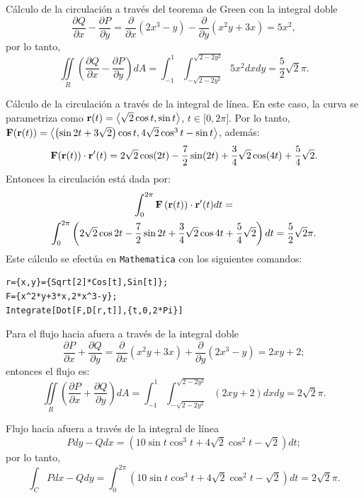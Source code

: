 \begin{parrafoitemize}
\item Cálculo de la circulación a través del teorema de Green con la integral doble
\[\frac{\partial Q}{\partial x}-\frac{\partial P}{\partial y}=\frac{\partial }{\partial x}\left( 2x^{3}-y\right)-
\frac{\partial }{\partial y}\left( x^{2}y+3x\right) = 5x^{2},\]
por lo tanto,
\[\iint\limits_{R}\left( \frac{\partial Q}{\partial x}-\frac{\partial P}{\partial y}\right) dA=\int_{-1}^{1}\int_{-\sqrt{2-2y^{2}} }^{\sqrt{2-2y^{2}} }5x^{2}dxdy= \frac{5}{2}\sqrt{2}\pi.\]
\item Cálculo de la circulación a través de la integral de línea. En este caso, la curva se parametriza como
${\bf r}(t) =\left\langle \sqrt{2}\cos t,\sin t\right\rangle $, $t\in \lbrack 0,2\pi ]$.
Por lo tanto, ${\bf F}({\bf r}(t))=\left\langle \left( \sin 2t+3\sqrt{2}\right) \cos t,4\sqrt{2}\cos ^{3}t-\sin t\right\rangle$, además:
\[{\bf F}({\bf r}(t))\cdot{\bf r}^{\prime}(t)=2\sqrt{2}\cos(2t)-\frac{7}{2}\sin(2t)+\frac{3}{4}\sqrt{2}\cos(4t)+\frac{5}{4}\sqrt{2}.\] Entonces la circulación está dada por:
\begin{multline*} \int_{0}^{2\pi}{\bf F}\left({\bf r}(t)\right)\cdot{\bf r}^{\prime}(t) dt = \\ \int_{0}^{2\pi}\left( 2\sqrt{2}\cos 2t-\frac{7}{2}\sin 2t+\frac{3}{4}\sqrt{2}\cos 4t+\frac{5}{4}\sqrt{2}\right) dt
= \frac{5}{2}\sqrt{2}\pi.
\end{multline*}
Este cálculo se efectúa en \verb"Mathematica" con los siguientes comandos:

\begin{tcolorbox}[title=\bf Instrucción \verb"Mathematica"]\begin{Verbatim}[formatcom=\letraverbatim]
r={x,y}={Sqrt[2]*Cos[t],Sin[t]};
F={x^2*y+3*x,2*x^3-y};
Integrate[Dot[F,D[r,t]],{t,0,2*Pi}]
\end{Verbatim}
\end{tcolorbox}

\item Para el flujo hacia afuera a través de la integral doble
\[\frac{\partial P}{\partial x}+\frac{\partial Q}{\partial y}=\frac{\partial }{\partial x}\left( x^{2}y+3x\right) +\frac{\partial }{\partial y}\left(2x^{3}-y\right) = 2xy+2;\]
entonces el flujo es:
\[\iint\limits_{R}\left(\frac{\partial P}{\partial x}+\frac{\partial Q}{\partial y}\right)dA = \int_{-1}^{1}\int_{-\sqrt{2-2y^{2}}}^{\sqrt{2-2y^{2}} }\left( 2xy+2\right) dxdy= 2\sqrt{2}\pi.\]

\item Flujo hacia afuera a través de la integral de línea
\[Pdy-Qdx= \left( 10\sin t\cos ^{3}t+4\sqrt{2}\cos ^{2}t-\sqrt{2}\right) dt;\]
por lo tanto,
\[\int_{C}Pdx-Qdy=\int_{0}^{2\pi }\left( 10\sin t\cos ^{3}t+4\sqrt{2}\cos ^{2}t-\sqrt{2}\right) dt= 2\sqrt{2}\pi.\]
\end{parrafoitemize}

